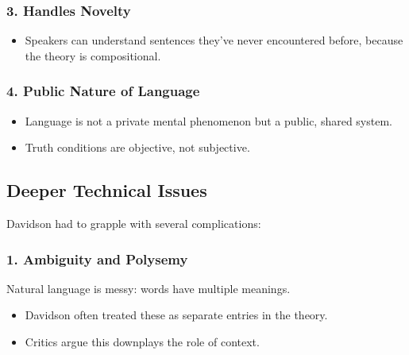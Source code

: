 \documentclass[12pt]{article}
\newcommand{\tightlist}{\itemsep 0pt\parskip 0pt\parsep 0pt}
\begin{document}
\hypertarget{handles-novelty}{%
\subsubsection{\texorpdfstring{3. \textbf{Handles
Novelty}}{3. Handles Novelty}}\label{handles-novelty}}

\begin{itemize}
\tightlist
\item
  Speakers can understand sentences they've never encountered before,
  because the theory is compositional.
\end{itemize}

\hypertarget{public-nature-of-language}{%
\subsubsection{\texorpdfstring{4. \textbf{Public Nature of
Language}}{4. Public Nature of Language}}\label{public-nature-of-language}}

\begin{itemize}
\tightlist
\item
  Language is not a private mental phenomenon but a public, shared
  system.
\item
  Truth conditions are objective, not subjective.
\end{itemize}

\hypertarget{deeper-technical-issues}{%
\subsection{Deeper Technical Issues}\label{deeper-technical-issues}}

Davidson had to grapple with several complications:

\hypertarget{ambiguity-and-polysemy}{%
\subsubsection{\texorpdfstring{1. \textbf{Ambiguity and
Polysemy}}{1. Ambiguity and Polysemy}}\label{ambiguity-and-polysemy}}

Natural language is messy: words have multiple meanings.

\begin{itemize}
\tightlist
\item
  Davidson often treated these as separate entries in the theory.
\item
  Critics argue this downplays the role of context.
\end{itemize}
\end{document}
